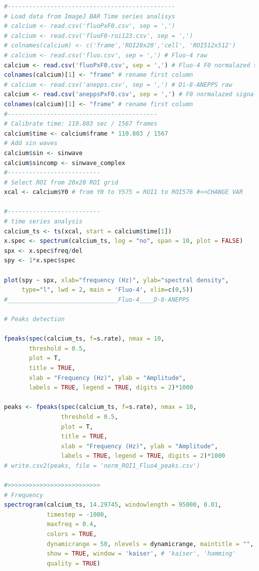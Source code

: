 \documentclass{biophys-new}
\begin{document}
\begin{lstlisting}[language=R]
#-----------------------------------------------
# Load data from ImageJ BAR Time series analisys
# calcium <- read.csv('fluoPxF0.csv', sep = ',')
# calcium <- read.csv('fluoF0-roi123.csv', sep = ',')
# colnames(calcium) <- c('frame','ROI20x20','cell', 'ROI512x512')
# calcium <- read.csv('fluo.csv', sep = ',') # Fluo-4 raw
calcium <- read.csv('fluoPxF0.csv', sep = ',') # Fluo-4 F0 normalazed signal
colnames(calcium)[1] <- "frame" # rename first column
# calcium <- read.csv('anepps.csv', sep = ',') # Di-8-ANEPPS raw
calcium <- read.csv('aneppsPxF0.csv', sep = ',') # F0 normalazed signal
colnames(calcium)[1] <- "frame" # rename first column
#------------------------------------------
# Calibrate time: 110.803 sec / 1567 frames
calcium$time <- calcium$frame * 110.803 / 1567
# Add sin waves
calcium$sin <- sinwave
calcium$sincomp <- sinwave_complex
#--------------------------
# Select ROI from 20x20 ROI grid
xcal <- calcium$Y0 # from Y0 to Y575 = ROI1 to ROI576 #<<CHANGE VAR

#--------------------------
# time series analysis
calcium_ts <- ts(xcal, start = calcium$time[1])
x.spec <- spectrum(calcium_ts, log = "no", span = 10, plot = FALSE)
spx <- x.spec$freq/del
spy <- 1*x.spec$spec

plot(spy ~ spx, xlab="frequency (Hz)", ylab="spectral density",
     type="l", lwd = 2, main = 'Fluo-4', xlim=c(0,5))
#_______________________________Fluo-4____D-8-ANEPPS

# Peaks detection

fpeaks(spec(calcium_ts, f=s.rate), nmax = 10,
       threshold = 0.5,
       plot = T,
       title = TRUE,
       xlab = "Frequency (Hz)", ylab = "Amplitude",
       labels = TRUE, legend = TRUE, digits = 2)*1000

peaks <- fpeaks(spec(calcium_ts, f=s.rate), nmax = 10,
                threshold = 0.5,
                plot = T,
                title = TRUE,
                xlab = "Frequency (Hz)", ylab = "Amplitude",
                labels = TRUE, legend = TRUE, digits = 2)*1000
# write.csv2(peaks, file = 'norm_ROI1_Fluo4_peaks.csv')

#>>>>>>>>>>>>>>>>>>>>>>>>>>
# Frequency
spectrogram(calcium_ts, 14.29745, windowlength = 95000, 0.01,
            timestep = -1000,
            maxfreq = 0.4,
            colors = TRUE,
            dynamicrange = 50, nlevels = dynamicrange, maintitle = "",
            show = TRUE, window = 'kaiser', # 'kaiser', 'hamming'
            quality = TRUE)


\end{lstlisting}
\end{document}
